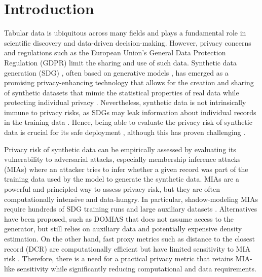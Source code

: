 \section{Introduction}
Tabular data is ubiquitous across many fields and plays a fundamental role in scientific discovery and data-driven decision-making.
However, privacy concerns and regulations such as the European Union's General Data Protection Regulation (GDPR) limit the sharing and use of such data.
Synthetic data generation (SDG) \citep{jordon2022synthetic, hernandez2022synthetic}, often based on generative models \citep{xu2019modeling}, has emerged as a promising privacy-enhancing technology that allows for the creation and sharing of synthetic datasets that mimic the statistical properties of real data while protecting individual privacy \citep{bellovin2019privacy}.
Nevertheless, synthetic data is not intrinsically immune to privacy risks, as SDGs may leak information about individual records in the training data \citep{carlini2019secret, stadler2022synthetic}. 
Hence, being able to evaluate the privacy risk of synthetic data is crucial for its safe deployment \citep{giomi2023unified}, although this has proven challenging \citep{yao2025dcr, stadler2022synthetic}.

Privacy risk of synthetic data can be empirically assessed by evaluating its vulnerability to adversarial attacks, especially membership inference attacks (MIAs) \citep{homer2008resolving, shokri2017membership, salem2018ml, stadler2022synthetic, hu2022membership} where an attacker tries to infer whether a given record was part of the training data used by the model to generate the synthetic data.
MIAs are a powerful and principled way to assess privacy risk, but they are often computationally intensive and data-hungry.
In particular, shadow-modeling MIAs require hundreds of SDG training runs and large auxiliary datasets \citep{stadler2022synthetic, houssiau2022tapas, meeus2023achilles}. Alternatives have been proposed, such as DOMIAS \citep{van2023membership} that does not assume access to the generator, but still relies on auxiliary data and potentially expensive density estimation. On the other hand, fast proxy metrics such as distance to the closest record (DCR) \citep{park2018data, kotelnikov2023tabddpm, platzer2021holdout} are computationally efficient but have limited sensitivity to MIA risk \citep{yao2025dcr}.
Therefore, there is a need for a practical privacy metric that retains MIA-like sensitivity while significantly reducing computational and data requirements. 

